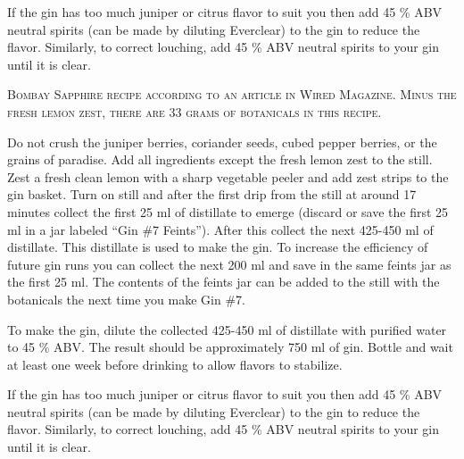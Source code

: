\documentclass[letterpaper]{recipePMG}
\begin{document}
If the gin has too much juniper or citrus flavor to suit you then 
add 45 \% ABV neutral spirits (can be made by diluting Everclear) to the gin to reduce the flavor. Similarly, to correct louching, add 45 \% ABV neutral spirits to your gin until it is clear.



\newpage

\label{GinNumber7}


\textsc{Bombay Sapphire recipe according to an article in Wired Magazine. Minus the fresh lemon zest, there are 33 grams of botanicals in this recipe.}

Do not crush the juniper berries, coriander seeds, cubed pepper berries, or the grains of paradise. Add all ingredients except the fresh lemon zest to the still.   Zest a fresh clean lemon with a sharp vegetable peeler and add zest strips to the gin basket.  Turn on still and after the first drip from the still at around 17 minutes collect the first 25 ml of distillate to emerge (discard or save the first 25 ml in a jar labeled ``Gin \#7 Feints'').  After this collect the next 425-450 ml of distillate. This distillate is used to make the gin. To increase the efficiency of future gin runs you can collect the next 200 ml and save in the same feints jar as the first 25 ml. The contents of the feints jar can be added to the still with the botanicals the next time you make Gin \#7.

To make the gin, dilute the collected 425-450 ml of distillate with purified water to 45 \% ABV. The result should be approximately 750 ml of gin. Bottle and wait at least one week before drinking to allow flavors to stabilize.

If the gin has too much juniper or citrus flavor to suit you then 
add 45 \% ABV neutral spirits (can be made by diluting Everclear) to the gin to reduce the flavor. Similarly, to correct louching, add 45 \% ABV neutral spirits to your gin until it is clear.

\newpage
{}
\label{GinNumber11}
\end{document}
